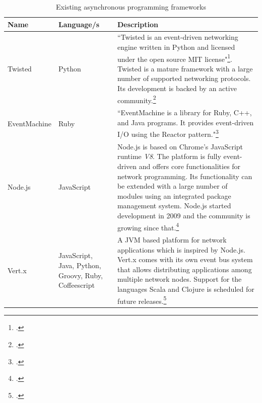 \begin{savenotes} %
\begin{table}[ht]
\begin{tabular*}{\textwidth}{p{} p{} p{}}
\toprule
\textbf{Name} & \textbf{Language/s} & \textbf{Description} \\
\midrule 
Twisted			& Python			& ``Twisted is an event-driven networking engine written in 
									  Python and licensed under the open source MIT license"\footcite[Cf.]{Twisted_2012}.
									  Twisted is a mature framework with a large number of supported networking
									  protocols. Its development is backed by an active
									  community.\footcite[Cf.][12]{fettig_2005}
									  \\
									  
EventMachine 	& Ruby    			& ``EventMachine is a library for Ruby, C++, and Java
									  programs. It provides event-driven I/O using the Reactor 
									  pattern."\footcite[]{eventmachine_2012}\\

Node.js			& JavaScript		& Node.js is based on Chrome's JavaScript runtime \textit{V8}.
									  The platform is fully event-driven and offers core
									  functionalities for network programming. Its functionality
									  can be extended with a large number of modules using an
									  integrated package management system.
									  Node.js started development in 2009 and the community
									  is growing since that.\footcite[Cf.][]{Mashtable_2011}\\
									  
Vert.x			& JavaScript, Java, Python, Groovy, Ruby, Coffeescript		
									& A JVM based platform for network applications which is
									  inspired by Node.js. Vert.x comes with its own event
									  bus system that allows distributing applications
									  among multiple network nodes. Support for the languages
									  Scala and Clojure is scheduled for future releases.\footcite[Cf.][]{vertx_2012}\\
\bottomrule 
\end{tabular*}
  \caption{Existing asynchronous programming frameworks}
  \label{tab:existing_frameworks}
\end{table}
\end{savenotes}

